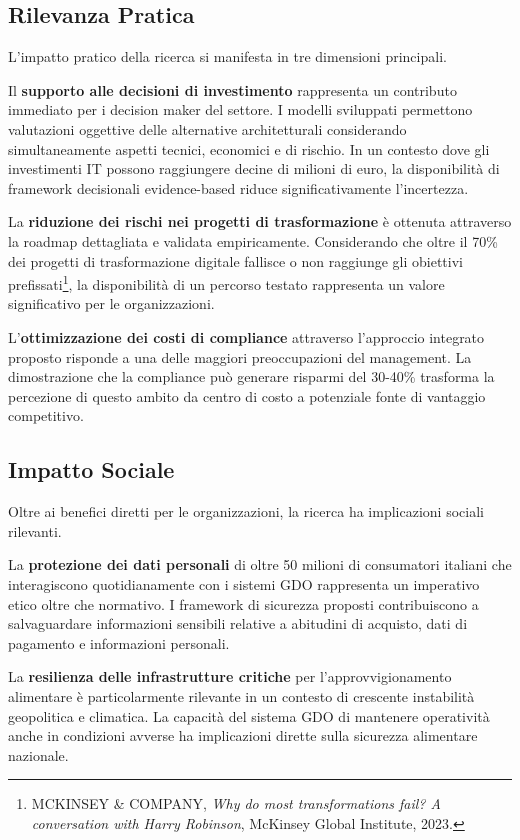 \subsection{Rilevanza Pratica}

L'impatto pratico della ricerca si manifesta in tre dimensioni principali.

Il \textbf{supporto alle decisioni di investimento} rappresenta un contributo immediato per i decision maker del settore. I modelli sviluppati permettono valutazioni oggettive delle alternative architetturali considerando simultaneamente aspetti tecnici, economici e di rischio. In un contesto dove gli investimenti IT possono raggiungere decine di milioni di euro, la disponibilità di framework decisionali evidence-based riduce significativamente l'incertezza.

La \textbf{riduzione dei rischi nei progetti di trasformazione} è ottenuta attraverso la roadmap dettagliata e validata empiricamente. Considerando che oltre il 70\% dei progetti di trasformazione digitale fallisce o non raggiunge gli obiettivi prefissati\footnote{MCKINSEY \& COMPANY, \textit{Why do most transformations fail? A conversation with Harry Robinson}, McKinsey Global Institute, 2023.}, la disponibilità di un percorso testato rappresenta un valore significativo per le organizzazioni.

L'\textbf{ottimizzazione dei costi di compliance} attraverso l'approccio integrato proposto risponde a una delle maggiori preoccupazioni del management. La dimostrazione che la compliance può generare risparmi del 30-40\% trasforma la percezione di questo ambito da centro di costo a potenziale fonte di vantaggio competitivo.

\subsection{Impatto Sociale}

Oltre ai benefici diretti per le organizzazioni, la ricerca ha implicazioni sociali rilevanti.

La \textbf{protezione dei dati personali} di oltre 50 milioni di consumatori italiani che interagiscono quotidianamente con i sistemi GDO rappresenta un imperativo etico oltre che normativo. I framework di sicurezza proposti contribuiscono a salvaguardare informazioni sensibili relative a abitudini di acquisto, dati di pagamento e informazioni personali.

La \textbf{resilienza delle infrastrutture critiche} per l'approvvigionamento alimentare è particolarmente rilevante in un contesto di crescente instabilità geopolitica e climatica. La capacità del sistema GDO di mantenere operatività anche in condizioni avverse ha implicazioni dirette sulla sicurezza alimentare nazionale.

